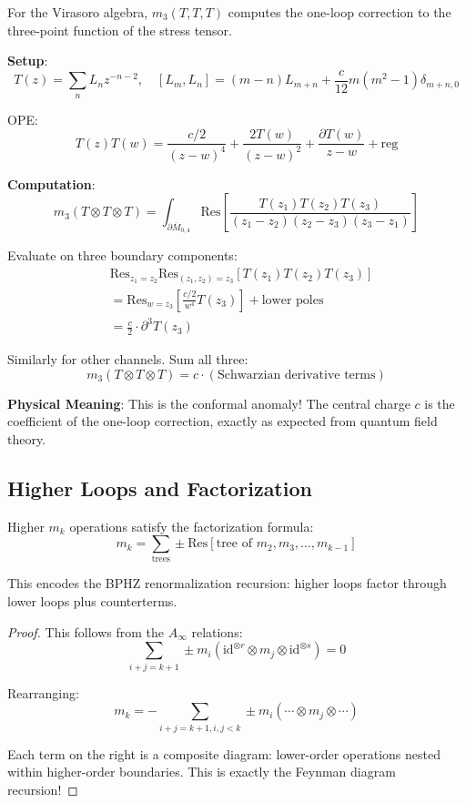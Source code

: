 \begin{example}\label{ex:virasoro-one-loop}
For the Virasoro algebra, $m_3(T,T,T)$ computes the one-loop correction to the 
three-point function of the stress tensor.

\textbf{Setup}:
$$T(z) = \sum_n L_n z^{-n-2}, \quad [L_m, L_n] = (m-n)L_{m+n} + 
\frac{c}{12}m(m^2-1)\delta_{m+n,0}$$

OPE:
$$T(z)T(w) = \frac{c/2}{(z-w)^4} + \frac{2T(w)}{(z-w)^2} + 
\frac{\partial T(w)}{z-w} + \text{reg}$$

\textbf{Computation}:
$$m_3(T \otimes T \otimes T) = \int_{\partial \overline{M}_{0,4}} 
\text{Res}\left[\frac{T(z_1)T(z_2)T(z_3)}{(z_1-z_2)(z_2-z_3)(z_3-z_1)}\right]$$

Evaluate on three boundary components:
\begin{align*}
&\text{Res}_{z_1=z_2}\text{Res}_{(z_1,z_2)=z_3}[T(z_1)T(z_2)T(z_3)] \\
&= \text{Res}_{w=z_3}\left[\frac{c/2}{w^4}T(z_3)\right] + \text{lower poles} \\
&= \frac{c}{2} \cdot \partial^3 T(z_3)
\end{align*}

Similarly for other channels. Sum all three:
$$m_3(T \otimes T \otimes T) = c \cdot (\text{Schwarzian derivative terms})$$

\textbf{Physical Meaning}: This is the conformal anomaly! The central charge $c$ 
is the coefficient of the one-loop correction, exactly as expected from quantum 
field theory.
\end{example}

\subsection{Higher Loops and Factorization}

\begin{theorem}
Higher $m_k$ operations satisfy the factorization formula:
$$m_k = \sum_{\text{trees}} \pm \text{Res}[\text{tree of } m_2, m_3, \ldots, m_{k-1}]$$

This encodes the BPHZ renormalization recursion: higher loops factor through 
lower loops plus counterterms.
\end{theorem}

\begin{proof}
This follows from the $A_\infty$ relations:
$$\sum_{i+j=k+1} \pm m_i(\text{id}^{\otimes r} \otimes m_j \otimes 
\text{id}^{\otimes s}) = 0$$

Rearranging:
$$m_k = -\sum_{i+j=k+1, i,j<k} \pm m_i(\cdots \otimes m_j \otimes \cdots)$$

Each term on the right is a composite diagram: lower-order operations nested 
within higher-order boundaries. This is exactly the Feynman diagram recursion!
\end{proof}

